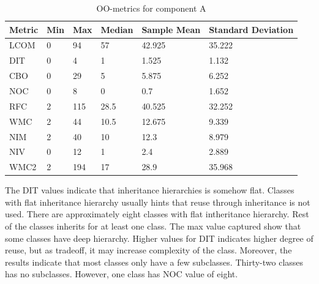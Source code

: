 \begin{table}[]
\centering
\caption{OO-metrics for component A}
\label{tab:oometrics-al}
\begin{tabular}{|l|l|l|l|l|l|}
\hline
\textbf{Metric} & \textbf{Min} & \textbf{Max} & \textbf{Median} & \textbf{Sample Mean} & \textbf{Standard Deviation} \\ \hline
LCOM            & 0            & 94           & 57              & 42.925               & 35.222                      \\ \hline
DIT             & 0            & 4            & 1               & 1.525                & 1.132                       \\ \hline
CBO             & 0            & 29           & 5               & 5.875                & 6.252                       \\ \hline
NOC             & 0            & 8            & 0               & 0.7                  & 1.652                       \\ \hline
RFC             & 2            & 115          & 28.5            & 40.525               & 32.252                      \\ \hline
WMC             & 2            & 44           & 10.5            & 12.675               & 9.339                       \\ \hline
NIM             & 2            & 40           & 10              & 12.3                 & 8.979                       \\ \hline
NIV             & 0            & 12           & 1               & 2.4                  & 2.889                       \\ \hline
WMC2            & 2            & 194          & 17              & 28.9                 & 35.968                      \\ \hline
\end{tabular}
\end{table}

The DIT values indicate that inheritance hierarchies is somehow flat. Classes with flat inheritance hierarchy usually hints that reuse through inheritance is not used. There are approximately eight classes with flat intheritance hierarchy. Rest of the classes inherits for at least one class. The max value captured show that some classes have deep hierarchy. Higher values for DIT indicates higher degree of reuse, but as tradeoff, it may increase complexity of the class. Moreover, the results indicate that most classes only have a few subclasses. Thirty-two classes has no subclasses. However, one class has NOC value of eight. 

